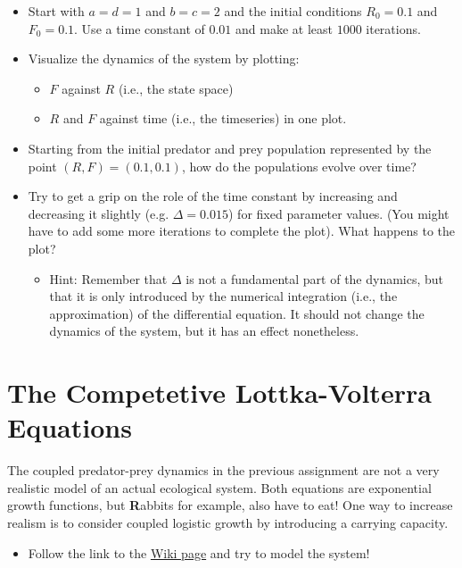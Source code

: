 \documentclass[]{book}
\providecommand{\tightlist}{%
  \setlength{\itemsep}{0pt}\setlength{\parskip}{0pt}}
\let\stdsection\section
\renewcommand\section{\newpage\stdsection}
\begin{document}
\begin{itemize}
\tightlist
\item
  Start with \(a = d = 1\) and \(b = c = 2\) and the initial conditions
  \(R_0 = 0.1\) and \(F_0 = 0.1\). Use a time constant of \(0.01\) and
  make at least \(1000\) iterations.
\item
  Visualize the dynamics of the system by plotting:

  \begin{itemize}
  \tightlist
  \item
    \(F\) against \(R\) (i.e., the state space)
  \item
    \(R\) and \(F\) against time (i.e., the timeseries) in one plot.
  \end{itemize}
\item
  Starting from the initial predator and prey population represented by
  the point \((R, F) = (0.1, 0.1)\), how do the populations evolve over
  time?
\item
  Try to get a grip on the role of the time constant by increasing and
  decreasing it slightly (e.g. \(\Delta = 0.015\)) for fixed parameter
  values. (You might have to add some more iterations to complete the
  plot). What happens to the plot?

  \begin{itemize}
  \tightlist
  \item
    Hint: Remember that \(\Delta\) is not a fundamental part of the
    dynamics, but that it is only introduced by the numerical
    integration (i.e., the approximation) of the differential equation.
    It should not change the dynamics of the system, but it has an
    effect nonetheless.
  \end{itemize}
\end{itemize}

\section{The Competetive Lottka-Volterra
Equations}\label{the-competetive-lottka-volterra-equations}

The coupled predator-prey dynamics in the previous assignment are not a
very realistic model of an actual ecological system. Both equations are
exponential growth functions, but \textbf{R}abbits for example, also
have to eat! One way to increase realism is to consider coupled logistic
growth by introducing a carrying capacity.

\begin{itemize}
\tightlist
\item
  Follow the link to the
  \href{https://en.wikipedia.org/wiki/Competitive_Lotka–Volterra_equations}{Wiki
  page} and try to model the system!
\end{itemize}
\end{document}
